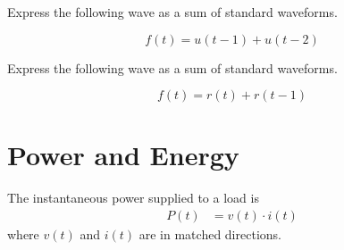 \documentclass[fleqn, a4paper, 12pt, twoside]{article}
\theoremstyle{definition}
\theoremstyle{theorem}
\begin{document}
\begin{question}
	Express the following wave as a sum of standard waveforms.
	\begin{figure}[H]
	\end{figure}
\end{question}

\begin{solution}
	\begin{equation*}
		f(t) = u(t - 1) + u(t - 2)
	\end{equation*}
\end{solution}

\begin{question}
	Express the following wave as a sum of standard waveforms.
	\begin{figure}[H]
	\end{figure}
\end{question}

\begin{solution}
	\begin{equation*}
		f(t) = r(t) + r(t - 1)
	\end{equation*}
\end{solution}

\section{Power and Energy}

The instantaneous power supplied to a load is
\begin{align*}
	P(t) &= v(t) \cdot i(t)
\end{align*}
where $v(t)$ and $i(t)$ are in matched directions.
\end{document}
